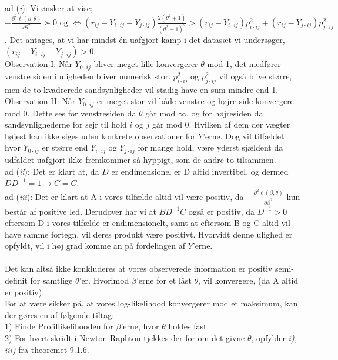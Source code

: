 \documentclass[11pt,a4paper]{article}
\begin{document}
ad (\textit{i}): 
Vi ønsker at vise; $-\frac{\partial^2 \ell(\beta;\theta)}{\partial \theta^2} \succ 0 \text{ og } \iff (r_{ij}- Y_{i\cdot ij}-Y_{j\cdot ij}) \frac{2(\theta^2+1)}{(\theta^2-1)^2}>(r_{ij}-Y_{i\cdot ij})p_{i\cdot ij}^2 + (r_{ij}-Y_{j\cdot ij})p_{j\cdot ij}^2$. Det antages, at vi har mindst én uafgjort kamp i det datasæt vi undersøger, $(r_{ij}- Y_{i\cdot ij}-Y_{j\cdot ij}) > 0$.
\\Observation I: Når $Y_{0\cdot ij}$ bliver meget lille konvergerer $\theta$ mod 1, det medfører venstre siden i uligheden bliver numerisk stor. $p_{i\cdot ij}^2$ og $p_{j\cdot ij}^2$ vil også blive større, men de to kvadrerede sandsynligheder vil stadig have en sum mindre end 1.\\
Observation II: Når $Y_{0\cdot ij}$ er meget stor vil både venstre og højre side konvergere mod 0. Dette ses for venstresiden da $\theta$ går mod  $\infty$, og for højresiden da sandsynlighederne for sejr til hold $i$ og $j$ går mod 0. Hvilken af dem der vægter højest kan ikke siges uden konkrete observationer for $Y$'erne. Dog vil tilfældet hvor $Y_{0 \cdot ij}$ er større end $Y_{i \cdot ij} \text{ og } Y_{j \cdot ij}$ for mange hold, være yderst sjældent da udfaldet uafgjort ikke fremkommer så hyppigt, som de andre to tilsammen.\\
ad (\textit{ii}): Det er klart at, da $D$ er endimensionel er D altid invertibel, og dermed $D D^{-1}=1 \rightarrow C=C$.\\
ad (\textit{iii}):
Det er klart at A i vores tilfælde altid vil være positiv, da $-\frac{\partial^2 \ell(\beta;\theta)}{\partial \beta^2}$ kun består af positive led.
Derudover har vi at $BD^{-1}C$ også er positiv, da $D^{-1}>0$ eftersom D i vores tilfælde er endimensionelt, samt at eftersom B og C altid vil have samme fortegn, vil deres produkt være positivt. Hvorvidt denne ulighed er opfyldt, vil 
i høj grad komme an på fordelingen af $Y$'erne. \\\\
Det kan altså ikke konkluderes at vores observerede information er positiv semi-definit for samtlige $\theta$'er. Hvorimod $\beta$'erne for et låst $\theta$, vil konvergere, (da A altid er positiv). \\
For at være sikker på, at vores log-likelihood konvergerer mod et maksimum, kan der gøres en af følgende tiltag:\\
1) Finde Profillikelihooden for $\beta$'erne, hvor $\theta$ holdes fast.\\
2) For hvert skridt i Newton-Raphton tjekkes der for om det givne $\theta$, opfylder \textit{i), iii)} fra theoremet 9.1.6.\\
\end{document}
